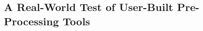 \begin{refsection}

    \subsection*{A Real-World Test of User-Built Pre-Processing Tools}


\end{refsection}
